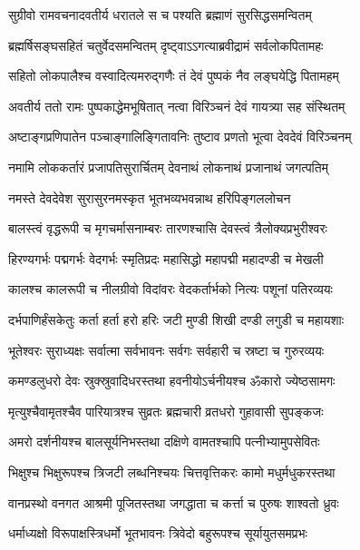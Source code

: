 \twolineshloka
{सुग्रीवो रामवचनादवतीर्य धरातले}
{स च पश्यति ब्रह्माणं सुरसिद्धसमन्वितम्}%

\twolineshloka
{ब्रह्मर्षिसङ्घसहितं चतुर्वेदसमन्वितम्}
{दृष्ट्वाऽऽगत्याब्रवीद्रामं सर्वलोकपितामहः}%

\twolineshloka
{सहितो लोकपालैश्च वस्वादित्यमरुद्गणैः}
{तं देवं पुष्पकं नैव लङ्घयेद्धि पितामहम्}%

\twolineshloka
{अवतीर्य ततो रामः पुष्पकाद्धेमभूषितात्}
{नत्वा विरिञ्चनं देवं गायत्र्या सह संस्थितम्}%

\twolineshloka
{अष्टाङ्गप्रणिपातेन पञ्चाङ्गालिङ्गितावनिः}
{तुष्टाव प्रणतो भूत्वा देवदेवं विरिञ्चनम्}%


\twolineshloka
{नमामि लोककर्तारं प्रजापतिसुरार्चितम्}
{देवनाथं लोकनाथं प्रजानाथं जगत्पतिम्}%

\twolineshloka
{नमस्ते देवदेवेश सुरासुरनमस्कृत}
{भूतभव्यभवन्नाथ हरिपिङ्गललोचन}%

\twolineshloka
{बालस्त्वं वृद्धरूपी च मृगचर्मासनाम्बरः}
{तारणश्चासि देवस्त्वं त्रैलोक्यप्रभुरीश्वरः}%

\twolineshloka
{हिरण्यगर्भः पद्मगर्भः वेदगर्भः स्मृतिप्रदः}
{महासिद्धो महापद्मी महादण्डी च मेखली}%

\twolineshloka
{कालश्च कालरूपी च नीलग्रीवो विदांवरः}
{वेदकर्तार्भको नित्यः पशूनां पतिरव्ययः}%

\twolineshloka
{दर्भपाणिर्हंसकेतुः कर्ता हर्ता हरो हरिः}
{जटी मुण्डी शिखी दण्डी लगुडी च महायशाः}%

\twolineshloka
{भूतेश्वरः सुराध्यक्षः सर्वात्मा सर्वभावनः}
{सर्वगः सर्वहारी च स्रष्टा च गुरुरव्ययः}%

\twolineshloka
{कमण्डलुधरो देवः स्रुक्स्रुवादिधरस्तथा}
{हवनीयोऽर्चनीयश्च ॐकारो ज्येष्ठसामगः}%

\twolineshloka
{मृत्युश्चैवामृतश्चैव पारियात्रश्च सुव्रतः}
{ब्रह्मचारी व्रतधरो गुहावासी सुपङ्कजः}%

\twolineshloka
{अमरो दर्शनीयश्च बालसूर्यनिभस्तथा}
{दक्षिणे वामतश्चापि पत्नीभ्यामुपसेवितः}%

\twolineshloka
{भिक्षुश्च भिक्षुरूपश्च त्रिजटी लब्धनिश्चयः}
{चित्तवृत्तिकरः कामो मधुर्मधुकरस्तथा}%

\twolineshloka
{वानप्रस्थो वनगत आश्रमी पूजितस्तथा}
{जगद्धाता च कर्त्ता च पुरुषः शाश्वतो ध्रुवः}%

\twolineshloka
{धर्माध्यक्षो विरूपाक्षस्त्रिधर्मो भूतभावनः}
{त्रिवेदो बहुरूपश्च सूर्यायुतसमप्रभः}%


